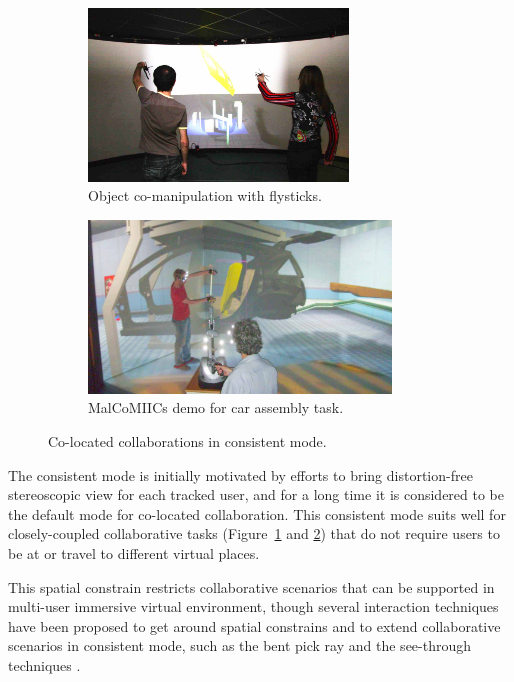 \begin{figure}[htb]
\begin{subfigure}{.45\textwidth}
    \centering
    \includegraphics[height=4.6cm]{figures/ch2/comanip}
    \caption{Object co-manipulation with flysticks.}
    \label{fig:2_consistent_collab:comanip}
  \end{subfigure}
  \begin{subfigure}{.55\textwidth}
    \centering
    \includegraphics[height=4.6cm]{figures/ch2/malcomiics}
    \caption{MalCoMIICs demo for car assembly task.}
    \label{fig:2_consistent_collab:malcomiics}
  \end{subfigure}
  \caption{\label{fig:2_consistent_collab}Co-located collaborations in consistent mode.}
\end{figure}

The consistent mode is initially motivated by efforts to bring distortion-free stereoscopic view for each tracked user, and for a long time it is considered to be the default mode for co-located collaboration. This consistent mode suits well for closely-coupled collaborative tasks \citep{Simon2005First, Aguerreche2010Comparison, Martin2011Reconfigurable} (Figure~\ref{fig:2_consistent_collab:comanip} and \ref{fig:2_consistent_collab:malcomiics}) that do not require users to be at or travel to different virtual places.

This spatial constrain restricts collaborative scenarios that can be supported in multi-user immersive virtual environment, though several interaction techniques have been proposed to get around spatial constrains and to extend collaborative scenarios in consistent mode, such as the bent pick ray \citep{Riege2006Bent} and the see-through techniques \citep{Argelaguet2010STT}.

